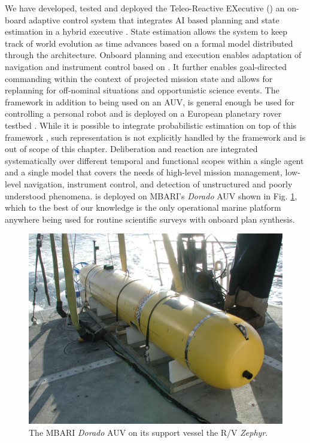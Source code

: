 We have developed, tested and deployed the Teleo-Reactive EXecutive
(\rxe) an on-board adaptive control system that integrates AI based
planning and state estimation in a hybrid executive
\cite{mcgann08a,mcgann08b,py10}.  State estimation allows the system
to keep track of world evolution as time advances based on a formal
model distributed through the architecture.  Onboard planning and
execution enables adaptation of navigation and instrument control
based on .  It further enables goal-directed
commanding within the context of projected mission state and allows
for replanning for off-nominal situations and opportunistic science
events. The framework in addition to being used on an AUV, is general
enough  be used for controlling a personal robot
\cite{pr2,Meeussen:2010dn,mcgann2009} and is deployed on a European
planetary rover testbed \cite{goac11}. While it is possible to
integrate probabilistic estimation on top of this framework
\cite{mcgann08d}, such representation is not explicitly handled by the
framework and is out of scope of this chapter.  Deliberation and
reaction are integrated systematically over different temporal and
functional scopes within a single agent and a single model that covers
the needs of high-level mission management, low-level navigation,
instrument control, and detection of unstructured and poorly
understood phenomena. \rx is deployed on MBARI's \emph{Dorado} AUV
shown in Fig. \ref{fig:auv-fig}, which to the best of our knowledge is
the only operational marine platform anywhere being used for routine
scientific surveys with onboard plan synthesis.

\begin{figure}[t]
  \centering \vskip-5pt
  \includegraphics[scale=0.1]{figs/MBARI-AUV.jpg}
  \caption{\small The MBARI \emph{Dorado} AUV on its support vessel
    the R/V \emph{Zephyr}.}
  \label{fig:auv-fig}
  \vskip-0.3cm
\end{figure}

